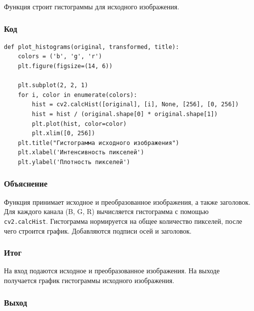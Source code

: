 \documentclass[a4paper,12pt]{article}
\begin{document}
Функция строит гистограммы для исходного изображения.

\subsubsection{Код}
\begin{verbatim}
def plot_histograms(original, transformed, title):
    colors = ('b', 'g', 'r')
    plt.figure(figsize=(14, 6))
    
    plt.subplot(2, 2, 1)
    for i, color in enumerate(colors):
        hist = cv2.calcHist([original], [i], None, [256], [0, 256])
        hist = hist / (original.shape[0] * original.shape[1])
        plt.plot(hist, color=color)
        plt.xlim([0, 256])
    plt.title("Гистограмма исходного изображения")
    plt.xlabel('Интенсивность пикселей')
    plt.ylabel('Плотность пикселей')
\end{verbatim}

\subsubsection{Объяснение}
Функция принимает исходное и преобразованное изображения, а также заголовок. Для каждого канала (B, G, R) вычисляется гистограмма с помощью \texttt{cv2.calcHist}. Гистограмма нормируется на общее количество пикселей, после чего строится график. Добавляются подписи осей и заголовок.

\subsubsection{Итог}
На вход подаются исходное и преобразованное изображения. На выходе получается график гистограммы исходного изображения.

\subsubsection{Выход}
\end{document}

